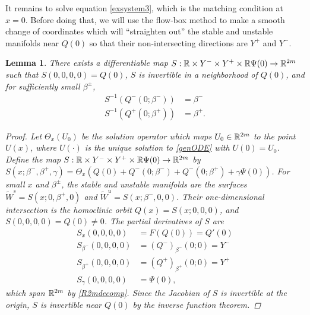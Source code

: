 \documentclass[12pt]{elsarticle}
\theoremstyle{plain}
\newtheorem{lemma}[theorem]{Lemma}
\theoremstyle{definition}
\theoremstyle{remark}
\numberwithin{theorem}{section}
\numberwithin{equation}{section}
\begin{document}
It remains to solve equation \cref{exsystem3}, which is the matching condition at $x = 0$. Before doing that, we will use the flow-box method to make a smooth change of coordinates which will ``straighten out'' the stable and unstable manifolds near $Q(0)$ so that their non-intersecting directions are $Y^+$ and $Y^-$.

\begin{lemma}\label{straightenW}
There exists a differentiable map $S: \mathbb{R} \times Y^- \times Y^+ \times \mathbb{R} \Psi(0) \rightarrow \mathbb{R}^{2m}$ such that $S(0, 0, 0, 0) = Q(0)$, $S$ is invertible in a neighborhood of $Q(0)$, and for sufficiently small $\beta^\pm$,
\begin{align*}
S^{-1}(Q^-(0; \beta^-)) &= \beta^-  \\
S^{-1}(Q^+(0; \beta^+)) &= \beta^+.
\end{align*}
\begin{proof}
Let $\Theta_x(U_0)$ be the solution operator which maps $U_0 \in \mathbb{R}^{2m}$ to the point $U(x)$, where $U(\cdot)$ is the unique solution to \cref{genODE} with $U(0) = U_0$. Define the map $S: \mathbb{R} \times Y^- \times Y^+ \times \mathbb{R} \Psi(0) \rightarrow \mathbb{R}^{2m}$ by 
$S(x; \beta^-, \beta^+, \gamma) = \Theta_x\left(Q(0) + Q^-(0; \beta^-) + Q^-(0; \beta^+) + \gamma \Psi(0)\right)$. 
For small $x$ and $\beta^\pm$, the stable and unstable manifolds are the surfaces $\tilde{W}^s = S(x; 0, \beta^+, 0)$ and $\tilde{W}^u = S(x; \beta^-, 0, 0)$. Their one-dimensional intersection is the homoclinic orbit $Q(x) = S(x; 0, 0, 0)$, and $S(0, 0, 0, 0) = Q(0) \neq 0$. The partial derivatives of $S$ are
\begin{align*}
S_x(0, 0, 0, 0) &= F(Q(0)) = Q'(0) \\
S_{\beta^-}(0, 0, 0, 0) &= (Q^-)_{\beta^-}(0; 0) = Y^- \\
S_{\beta^+}(0, 0, 0, 0) &= (Q^+)_{\beta^+}(0; 0) = Y^+ \\
S_{\gamma}(0, 0, 0, 0) &= \Psi(0),
\end{align*}
which span $\mathbb{R}^{2m}$ by \cref{R2mdecomp}. Since the Jacobian of $S$ is invertible at the origin, $S$ is invertible near $Q(0)$ by the inverse function theorem.
\end{proof}
\end{lemma}
\end{document}
